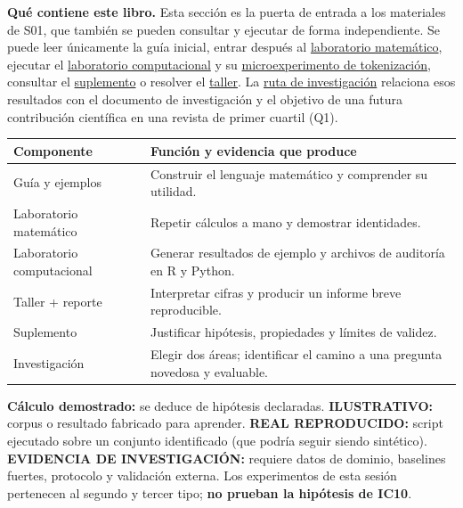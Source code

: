 \noindent\textbf{Qué contiene este libro.} Esta sección es la puerta de entrada a los materiales de S01, que también se
pueden consultar y ejecutar de forma independiente. Se puede leer únicamente la guía inicial, entrar después al
\hyperref[s01:lab:mat]{laboratorio matemático}, ejecutar el
\hyperref[s01:lab:comp]{laboratorio computacional} y su
\hyperref[s01:lab:ic10]{microexperimento de tokenización}, consultar el
\hyperref[s01:mod:sup]{suplemento} o resolver el
\hyperref[s01:mod:taller]{taller}. La \hyperref[s01:mod:invest]{ruta de investigación}
relaciona esos resultados con el documento de investigación y el objetivo de una
futura contribución científica en una revista de primer cuartil (Q1).

\begin{center}\small
\begin{tabular}{p{}p{}}
\toprule
\textbf{Componente} & \textbf{Función y evidencia que produce}\\\midrule
Guía y ejemplos & Construir el lenguaje matemático y comprender su utilidad.\\
Laboratorio matemático & Repetir cálculos a mano y demostrar identidades.\\
Laboratorio computacional & Generar resultados de ejemplo y archivos de auditoría en R y Python.\\
Taller + reporte & Interpretar cifras y producir un informe breve reproducible.\\
Suplemento & Justificar hipótesis, propiedades y límites de validez.\\
Investigación & Elegir dos áreas; identificar el camino a una pregunta novedosa y evaluable.\\\bottomrule
\end{tabular}
\end{center}
\begin{contraste}
\textbf{Cálculo demostrado:} se deduce de hipótesis declaradas.
\textbf{ILUSTRATIVO:} corpus o resultado fabricado para aprender.
\textbf{REAL REPRODUCIDO:} script ejecutado sobre un conjunto identificado
(que podría seguir siendo sintético).
\textbf{EVIDENCIA DE INVESTIGACIÓN:} requiere datos de dominio,
baselines fuertes, protocolo y validación externa. Los experimentos de esta
sesión pertenecen al segundo y tercer tipo; \textbf{no prueban la hipótesis de IC10}.
\end{contraste}



